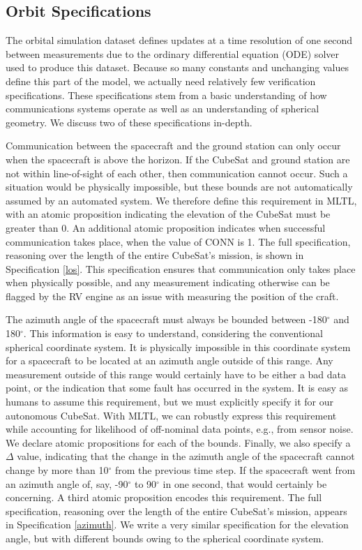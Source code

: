 \documentclass[conf]{new-aiaa}
\begin{document}
\subsection{Orbit Specifications}
\label{ref:orbitspec}

The orbital simulation dataset defines updates at a time resolution of one second between measurements due to the ordinary differential equation (ODE) solver used to produce this dataset. Because so many constants and unchanging values define this part of the model, we actually need relatively few verification specifications. These specifications stem from a basic understanding of how communications systems operate as well as an understanding of spherical geometry. We discuss two of these specifications in-depth. 

Communication between the spacecraft and the ground station can only occur when the spacecraft is above the horizon. If the CubeSat and ground station are not within line-of-sight of each other, then communication cannot occur. Such a situation would be physically impossible, but these bounds are not automatically assumed by an automated system. We therefore define this requirement in MLTL, with an atomic proposition indicating the elevation of the CubeSat must be greater than 0. An additional atomic proposition indicates when successful communication takes place, when the value of CONN is 1. The full specification, reasoning over the length of the entire CubeSat's mission, is shown in Specification \ref{los}. This specification ensures that communication only takes place when physically possible, and any measurement indicating otherwise can be flagged by the RV engine as an issue with measuring the position of the craft.

The azimuth angle of the spacecraft must always be bounded between -180$^{\circ}$ and 180$^{\circ}$. This information is easy to understand, considering the conventional spherical coordinate system. It is physically impossible in this coordinate system for a spacecraft to be located at an azimuth angle outside of this range. Any measurement outside of this range would certainly have to be either a bad data point, or the indication that some fault has occurred in the system. It is easy as humans to assume this requirement, but we must explicitly specify it for our autonomous CubeSat. With MLTL, we can robustly express this requirement while accounting for likelihood of off-nominal data points, e.g., from sensor noise. We declare atomic propositions for each of the bounds. Finally, we also specify a $\Delta$ value, indicating that the change in the azimuth angle of the spacecraft cannot change by more than 10$^{\circ}$ from the previous time step. If the spacecraft went from an azimuth angle of, say, -90$^{\circ}$ to 90$^{\circ}$ in one second, that would certainly be concerning. A third atomic proposition encodes this requirement. The full specification, reasoning over the length of the entire CubeSat's mission, appears in Specification \ref{azimuth}. We write a very similar specification for the elevation angle, but with different bounds owing to the spherical coordinate system.
\end{document}
